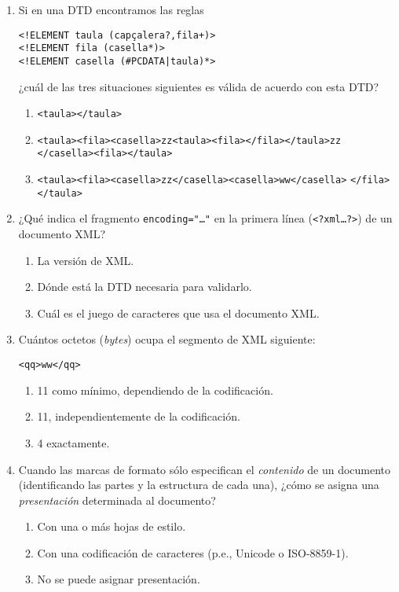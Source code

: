 {\begin{enumerate}
\item Si en una DTD encontramos las reglas 
\begin{verbatim} 
<!ELEMENT taula (capçalera?,fila+)> 
<!ELEMENT fila (casella*)> 
<!ELEMENT casella (#PCDATA|taula)*> 
\end{verbatim}
¿cuál de las tres situaciones siguientes es válida de acuerdo con esta DTD? \begin{enumerate} \item \verb|<taula></taula>| \item \verb|<taula><fila><casella>zz<taula><fila></fila></taula>zz| \verb|</casella><fila></taula>| \item \verb|<taula><fila><casella>zz</casella><casella>ww</casella>| \verb|</fila></taula>| \end{enumerate} 

\item ¿Qué indica el fragmento \texttt{encoding="\ldots"} en la primera línea (\texttt{<?xml\ldots?>}) de un documento XML? \begin{enumerate} \item La versión de XML. \item Dónde está la DTD necesaria para validarlo. \item Cuál es el juego de caracteres que usa el documento XML. \end{enumerate} 

\item Cuántos octetos (\emph{bytes}) ocupa el segmento de XML siguiente: \begin{center}\verb|<qq>ww</qq>|\end{center} \begin{enumerate} \item 11 como mínimo, dependiendo de la codificación. \item 11, independientemente de la codificación. \item 4 exactamente. \end{enumerate} 

\item Cuando las marcas de formato sólo especifican el \emph{contenido} de un documento (identificando las partes y la estructura de cada una), ¿cómo se asigna una \emph{presentación} determinada al documento? \begin{enumerate} \item Con una o más hojas de estilo. \item Con una codificación de caracteres (p.e., Unicode o ISO-8859-1). \item No se  puede asignar presentación. \end{enumerate} 


\end{enumerate}}
